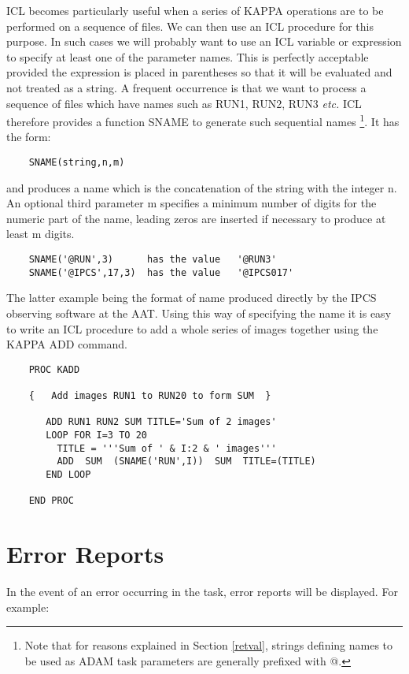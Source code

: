 \documentclass[twoside,11pt]{report}
\newcommand{\xlabel}[1]{}
\begin{document}
ICL becomes particularly useful when a series of KAPPA operations are to
be performed on a sequence of files. We can then use an ICL procedure for
this purpose. In such cases we will probably want to use an ICL variable
or expression to specify at least one of the parameter names. This is
perfectly acceptable provided the expression is placed in parentheses so
that it will be evaluated and not treated as a string. A frequent occurrence
is that we want to process a sequence of files which have names such as
RUN1, RUN2, RUN3 {\em etc.} ICL therefore provides a function SNAME to generate
such sequential names
\footnote{Note that for reasons explained in Section \ref{retval}, strings
defining names to be used as ADAM task parameters are generally prefixed with
@.}.
It has the form:
\begin{verbatim}
    SNAME(string,n,m)
\end{verbatim}

and produces a name which is the concatenation of the string with the integer
n. An optional third parameter m specifies a minimum number of digits for
the numeric part of the name, leading zeros are inserted if necessary to
produce at least m digits.
\begin{verbatim}
    SNAME('@RUN',3)      has the value   '@RUN3'
    SNAME('@IPCS',17,3)  has the value   '@IPCS017'
\end{verbatim}
The latter example being the format of name produced directly by the IPCS
observing software at the AAT. Using this way of specifying the name it
is easy to write an ICL procedure to add a whole series of images together
using the KAPPA ADD command.

\begin{verbatim}
    PROC KADD

    {   Add images RUN1 to RUN20 to form SUM  }

       ADD RUN1 RUN2 SUM TITLE='Sum of 2 images'
       LOOP FOR I=3 TO 20
         TITLE = '''Sum of ' & I:2 & ' images'''
         ADD  SUM  (SNAME('RUN',I))  SUM  TITLE=(TITLE)
       END LOOP

    END PROC
\end{verbatim}

\section{\xlabel{error_reports}Error Reports}
In the event of an error occurring in the task, error reports will be
displayed. For example:
\end{document}
